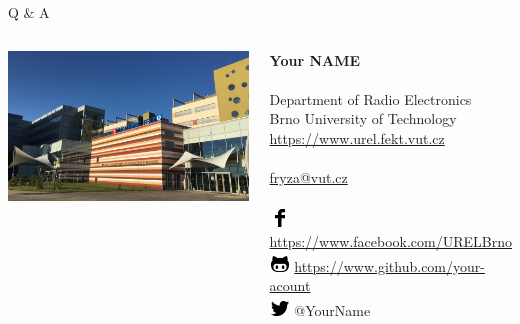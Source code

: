 \documentclass[aspectratio=1610]{beamer}
\begin{document}
\begin{frame}{Q \& A}
    \begin{columns}
        \begin{flushright}
            \includegraphics[width=1.\textwidth]{images/contacts/fekt_leto.jpg}
        \end{flushright}

        \textbf{Your NAME}\\
        ~\\
        Department of Radio Electronics\\
        Brno University of Technology\\
        \url{https://www.urel.fekt.vut.cz}\\
        ~\\
        \url{fryza@vut.cz}\\
        ~\\
        \includegraphics[scale=0.5]{images/contacts/icon_fcb.png} \url{https://www.facebook.com/URELBrno}\\

        \includegraphics[scale=0.5]{images/contacts/icon_github.png} \url{https://www.github.com/your-acount}\\

        \includegraphics[scale=0.5]{images/contacts/icon_twitter.png} @YourName\\
    \end{columns}
    \note{~}
\end{frame}
\end{document}
